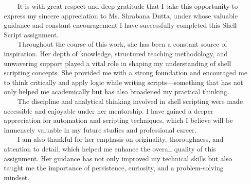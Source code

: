 {
~~~~It is with great respect and deep gratitude that I take this opportunity to express my sincere appreciation to Ms. Shrabana Dutta, under whose valuable guidance and constant encouragement I have successfully completed this Shell Script assignment.
\\[1ex]
~~~~Throughout the course of this work, she has been a constant source of inspiration. Her depth of knowledge, structured teaching methodology, and unwavering support played a vital role in shaping my understanding of shell scripting concepts. She provided me with a strong foundation and encouraged me to think critically and apply logic while writing scripts—something that has not only helped me academically but has also broadened my practical thinking.
\\[1ex]
~~~~The discipline and analytical thinking involved in shell scripting were made accessible and enjoyable under her mentorship. I have gained a deeper appreciation for automation and scripting techniques, which I believe will be immensely valuable in my future studies and professional career.
\\[1ex]
~~~~I am also thankful for her emphasis on originality, thoroughness, and attention to detail, which helped me enhance the overall quality of this assignment. Her guidance has not only improved my technical skills but also taught me the importance of persistence, curiosity, and a problem-solving mindset.
}